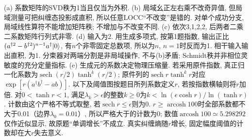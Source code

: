\begin{solution}(a) 系数矩阵的SVD秩为1当且仅当为外积. (b) 局域幺正左右乘不改奇异值, 但局域测量可把纠缠态投影成直积, 所以任意LOCC“不改变”是错的. 对单个成功分支, 局域线性算符不能增加矩阵秩; 不增加与不改变不同. (c) 依次3,1,2,2, 后两者二乘二系数矩阵行列式非零. (d) 输入为2. 用生成多项式, 按第1题指数, 输出正比$(a^{\dagger2}-b^{\dagger2})^{n-1}a^\dagger\lvert 0\rangle$, 有$n$个非零固定总数项, 所以为$n$, $n=1$时反而为1. 相干输入输出直积, 为1. 分束器对两端分割是非局域操作, 不与(b)矛盾; Schmidt秩并非相位灵敏度的充分定量指标. (e) 生成元的系数决定物理压缩量. 若采用原件指数, 真正归一化系数为$\operatorname{sech}(r/2)\tanh^k(r/2)$; 原件列的$\operatorname{sech}r\tanh^kr$对应$\exp[r(a^\dagger b^\dagger-ab)]$. 以下及阈值图按题目所列系数定义$r$, 若按指数横轴则将$r$加倍. 对$0<\tanh r<1$, 满足$\lambda_k>\epsilon$的整数$k\ge0$为$k<\ln(\epsilon\cosh r)/\ln(\tanh r)$. 计数由这个严格不等式取整, 若$\operatorname{sech}r\le\epsilon$则为0. $r\ge\operatorname{arcosh}100$时全部系数都不大于0.01（边界$\lambda_0=0.01$）, 所以严格大于的计数为0; 数值$\operatorname{arcosh}100\simeq5.298292$仅作近似显示, 故原题“单调增长”不成立. 真实纠缠熵随$r$增长, 固定幅度阈值的计数却在大$r$失去意义.
\end{solution}


